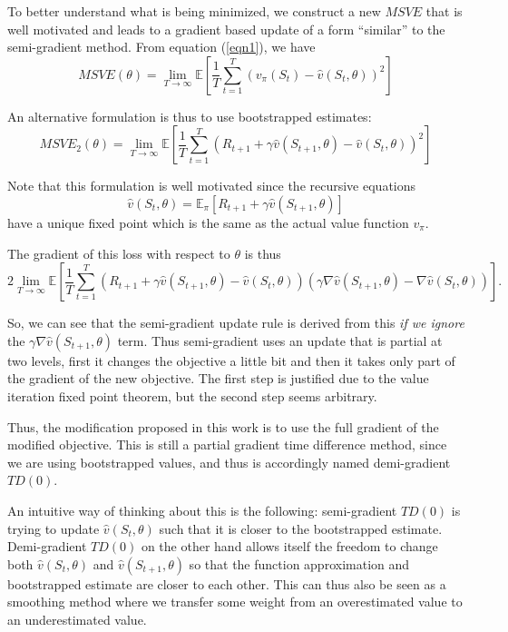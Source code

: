 \documentclass{article}
\begin{document}
To better understand what is being minimized, we construct a new $MSVE$ that is well motivated and leads to a gradient based update of a form ``similar'' to the semi-gradient method. From equation (\ref{eqn1}), we have
$$MSVE(\theta) =  \lim_{T \rightarrow \infty} \mathbb{E} \left[ \frac{1}{T} \sum_{t=1}^{T} {\left( v_{\pi}(S_t) - \hat{v}(S_t, \theta) \right)}^2 \right]$$

An alternative formulation is thus to use bootstrapped estimates:
$$MSVE_2(\theta) = \lim_{T \rightarrow \infty} \mathbb{E} \left[ \frac{1}{T} \sum_{t=1}^{T} {\left( R_{t+1} + \gamma \hat{v}(S_{t+1}, \theta) - \hat{v}(S_t, \theta) \right)}^2 \right]$$

Note that this formulation is well motivated since the recursive equations
$$\hat{v}(S_t, \theta) = \mathbb{E}_{\pi} \left[ R_{t+1} + \gamma \hat{v}(S_{t+1}, \theta) \right]$$
have a unique fixed point which is the same as the actual value function $v_{\pi}$.

The gradient of this loss with respect to $\theta$ is thus
$$2 \lim_{T \rightarrow \infty} \mathbb{E} \left[ \frac{1}{T} \sum_{t=1}^{T} \left( R_{t+1} + \gamma \hat{v}(S_{t+1}, \theta) - \hat{v}(S_t, \theta) \right) (\gamma \nabla \hat{v}(S_{t+1}, \theta) - \nabla \hat{v}(S_t, \theta))\right].$$

So, we can see that the semi-gradient update rule is derived from this \emph{if we ignore} the $\gamma \nabla \hat{v}(S_{t+1}, \theta)$ term. Thus semi-gradient uses an update that is partial at two levels, first it changes the objective a little bit and then it takes only part of the gradient of the new objective. The first step is justified due to the value iteration fixed point theorem, but the second step seems arbitrary.

Thus, the modification proposed in this work is to use the full gradient of the modified objective. This is still a partial gradient time difference method, since we are using bootstrapped values, and thus is accordingly named demi-gradient $TD(0)$.

An intuitive way of thinking about this is the following:
semi-gradient $TD(0)$ is trying to update $\hat{v}(S_{t}, \theta)$ such that it is closer to the bootstrapped estimate. Demi-gradient $TD(0)$ on the other hand allows itself the freedom to change both $\hat{v}(S_{t}, \theta)$ and $\hat{v}(S_{t+1}, \theta)$ so that the function approximation and bootstrapped estimate are closer to each other. This can thus also be seen as a smoothing method where we transfer some weight from an overestimated value to an underestimated value.
\end{document}
